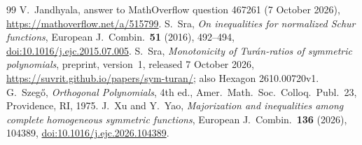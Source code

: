 \documentclass[11pt]{amsart}
\theoremstyle{remark}
\begin{document}
\begin{thebibliography}{99}
 V.~Jandhyala, answer to MathOverflow question 467261 (7 October 2026), \url{https://mathoverflow.net/a/515799}.
 S.~Sra, \emph{On inequalities for normalized Schur functions}, European J.\ Combin.\ \textbf{51} (2016), 492--494, \href{https://doi.org/10.1016/j.ejc.2015.07.005}{doi:10.1016/j.ejc.2015.07.005}.
 S.~Sra, \emph{Monotonicity of Tur\'an-ratios of symmetric polynomials}, preprint, version~1, released 7 October 2026, \url{https://suvrit.github.io/papers/sym-turan/}; also Hexagon 2610.00720v1.
 G.~Szeg\H{o}, \emph{Orthogonal Polynomials}, 4th ed., Amer.\ Math.\ Soc.\ Colloq.\ Publ.\ 23, Providence, RI, 1975.
 J.~Xu and Y.~Yao, \emph{Majorization and inequalities among complete homogeneous symmetric functions}, European J.\ Combin.\ \textbf{136} (2026), 104389, \href{https://doi.org/10.1016/j.ejc.2026.104389}{doi:10.1016/j.ejc.2026.104389}.
\end{thebibliography}
\end{document}
